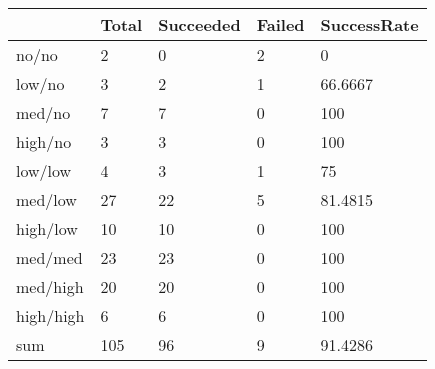 \begin{tabular}{lllll}
& Total & Succeeded & Failed & SuccessRate \\ 
\hline 
no/no & 2 & 0 & 2 & 0 \\ 
low/no & 3 & 2 & 1 & 66.6667 \\ 
med/no & 7 & 7 & 0 & 100 \\ 
high/no & 3 & 3 & 0 & 100 \\ 
low/low & 4 & 3 & 1 & 75 \\ 
med/low & 27 & 22 & 5 & 81.4815 \\ 
high/low & 10 & 10 & 0 & 100 \\ 
med/med & 23 & 23 & 0 & 100 \\ 
med/high & 20 & 20 & 0 & 100 \\ 
high/high & 6 & 6 & 0 & 100 \\ 
sum & 105 & 96 & 9 & 91.4286 \\ 
\hline 
\end{tabular}
